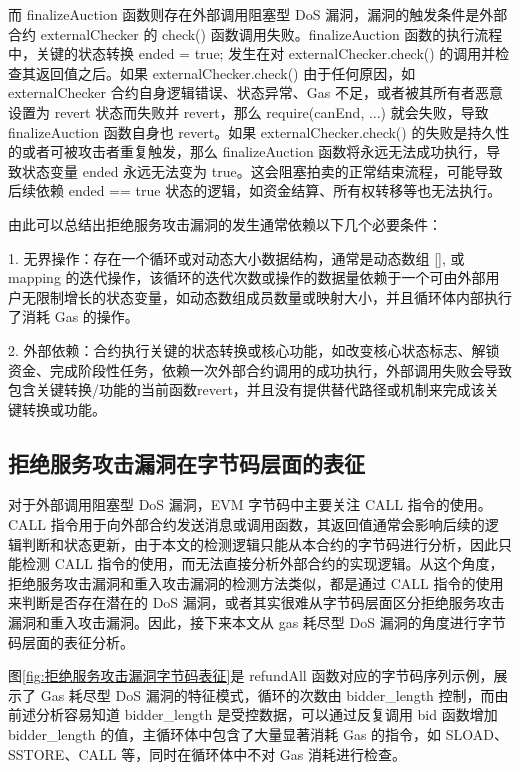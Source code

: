 \documentclass[print, master, vlined, timesmath]{DissertUESTC}
\begin{document}
而 finalizeAuction 函数则存在外部调用阻塞型 DoS 漏洞，漏洞的触发条件是外部合约 externalChecker 的 check() 函数调用失败。finalizeAuction 函数的执行流程中，关键的状态转换 ended = true; 发生在对 externalChecker.check() 的调用并检查其返回值之后。如果 externalChecker.check() 由于任何原因，如 externalChecker 合约自身逻辑错误、状态异常、Gas 不足，或者被其所有者恶意设置为 revert 状态而失败并 revert，那么 require(canEnd, ...) 就会失败，导致 finalizeAuction 函数自身也 revert。如果 externalChecker.check() 的失败是持久性的或者可被攻击者重复触发，那么 finalizeAuction 函数将永远无法成功执行，导致状态变量 ended 永远无法变为 true。这会阻塞拍卖的正常结束流程，可能导致后续依赖 ended == true 状态的逻辑，如资金结算、所有权转移等也无法执行。


由此可以总结出拒绝服务攻击漏洞的发生通常依赖以下几个必要条件：

1. 无界操作：存在一个循环或对动态大小数据结构，通常是动态数组 [], 或 mapping 的迭代操作，该循环的迭代次数或操作的数据量依赖于一个可由外部用户无限制增长的状态变量，如动态数组成员数量或映射大小，并且循环体内部执行了消耗 Gas 的操作。

2. 外部依赖：合约执行关键的状态转换或核心功能，如改变核心状态标志、解锁资金、完成阶段性任务，依赖一次外部合约调用的成功执行，外部调用失败会导致包含关键转换/功能的当前函数revert，并且没有提供替代路径或机制来完成该关键转换或功能。



\subsection{拒绝服务攻击漏洞在字节码层面的表征}


对于外部调用阻塞型 DoS 漏洞，EVM 字节码中主要关注 CALL 指令的使用。CALL 指令用于向外部合约发送消息或调用函数，其返回值通常会影响后续的逻辑判断和状态更新，由于本文的检测逻辑只能从本合约的字节码进行分析，因此只能检测 CALL 指令的使用，而无法直接分析外部合约的实现逻辑。从这个角度，拒绝服务攻击漏洞和重入攻击漏洞的检测方法类似，都是通过 CALL 指令的使用来判断是否存在潜在的 DoS 漏洞，或者其实很难从字节码层面区分拒绝服务攻击漏洞和重入攻击漏洞。因此，接下来本文从 gas 耗尽型 DoS 漏洞的角度进行字节码层面的表征分析。

图\ref{fig:拒绝服务攻击漏洞字节码表征}是 refundAll 函数对应的字节码序列示例，展示了 Gas 耗尽型 DoS 漏洞的特征模式，循环的次数由 bidder\_length 控制，而由前述分析容易知道 bidder\_length 是受控数据，可以通过反复调用 bid 函数增加 bidder\_length 的值，主循环体中包含了大量显著消耗 Gas 的指令，如 SLOAD、SSTORE、CALL 等，同时在循环体中不对 Gas 消耗进行检查。
\end{document}
